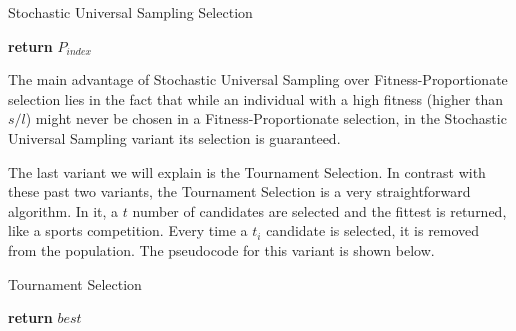 \begin{algorithm}[H]
    \caption{Stochastic Universal Sampling Selection}
    \begin{algorithmic}[1]
             
             
            \EndIf
             
            \EndFor
        \EndProcedure
            \EndWhile
            \State \textbf{return} $P_{index}$
        \EndProcedure
    \end{algorithmic}
\end{algorithm}

The main advantage of Stochastic Universal Sampling over Fitness-Proportionate selection lies in the fact that while an individual with a high fitness (higher than $s/l$) might never be chosen in a Fitness-Proportionate selection, in the Stochastic Universal Sampling variant its selection is guaranteed.

The last variant we will explain is the Tournament Selection. In contrast with these past two variants, the Tournament Selection is a very straightforward algorithm. In it, a $t$ number of candidates are selected and the fittest is returned, like a sports competition. Every time a $t_{i}$ candidate is selected, it is removed from the population. The pseudocode for this variant is shown below. 

\begin{algorithm}[H]
    \caption{Tournament Selection}
    \begin{algorithmic}[1]
                \EndIf
            \EndFor
            \State \textbf{return} $best$
        \EndProcedure
    \end{algorithmic}
\end{algorithm}


